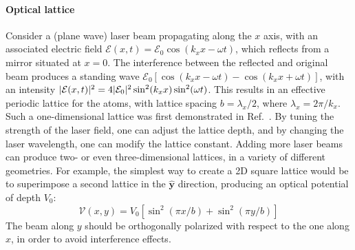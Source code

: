 \paragraph{Optical lattice}
Consider a (plane wave) laser beam propagating along the $x$ axis,
with an associated electric field
$\bm{\mathcal{E}}(x,t) = \bm{\mathcal{E}}_0 \cos (k_x x - \omega t)$,
which reflects from a mirror situated at $x=0$. The interference
between the reflected and original beam produces a standing wave
$\bm{\mathcal{E}}_0[\cos(k_x x - \omega t) - \cos(k_x x + \omega t)]$,
with an intensity
$\vert \mathcal{E}(x,t) \vert^2 = 4 \vert \mathcal{E}_0 \vert^2 \sin^2(k_x
x)\sin^2(\omega t)$. This results in an effective periodic lattice for
the atoms, with lattice spacing $b = \lambda_x/2$, where
$\lambda_x = 2\pi/k_x$. Such a one-dimensional lattice was first
demonstrated in Ref.~\cite{Anderson1686}. By tuning the strength of
the laser field, one can adjust the lattice depth, and by changing the
laser wavelength, one can modify the lattice constant. Adding more
laser beams can produce two- or even three-dimensional lattices, in a
variety of different geometries. For example, the simplest way to
create a 2D square lattice would be to superimpose a second lattice in
the $\hat{\bm{y}}$ direction, producing an optical potential of depth
$V_0$:
%
\begin{equation}\label{eq:square-potential}
  \mathcal{V}(x,y) = V_0[\sin^2(\pi x/b) + \sin^2(\pi y/b)]
\end{equation}
% 
The beam along $y$ should be orthogonally polarized with respect to
the one along $x$, in order to avoid interference effects.


